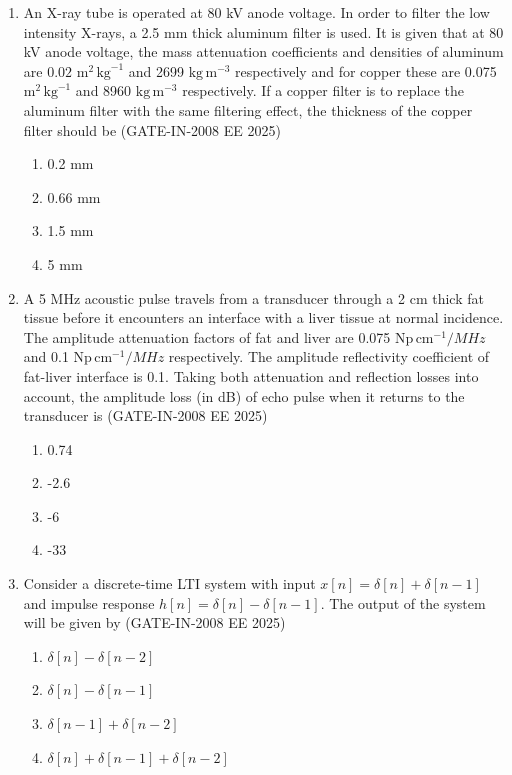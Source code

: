\documentclass[journal,12pt,onecolumn]{IEEEtran}
\theoremstyle{remark}
\begin{document}
\begin{enumerate}[label=Q.\arabic*,start=1]
    \item An X-ray tube is operated at 80 kV anode voltage. In order to filter the low intensity X-rays, a
2.5 mm thick aluminum filter is used. It is given that at 80 kV anode voltage, the mass attenuation
coefficients and densities of aluminum are $0.02$ $\text{m}^{2}\,\text{kg}^{-1}$ and 2699 $\text{kg}\,\text{m}^{-3}$ respectively and for copper
these are 0.075 $\text{m}^{2}\,\text{kg}^{-1}$ and 8960 $\text{kg}\,\text{m}^{-3}$ respectively. If a copper filter is to replace the aluminum
filter with the same filtering effect, the thickness of the copper filter should be (GATE-IN-2008 EE 2025)

    \begin{enumerate} 
        \item 0.2 mm
        \item 0.66 mm
        \item 1.5 mm
        \item 5 mm
    \end{enumerate}
    
    
    
    \item A 5 MHz acoustic pulse travels from a transducer through a 2 cm thick fat tissue before it
encounters an interface with a liver tissue at normal incidence. The amplitude attenuation factors of
fat and liver are 0.075 $\text{Np}\,\text{cm}^{-1}/MHz$ and 0.1 $\text{Np}\,\text{cm}^{-1}/MHz$ respectively. The amplitude reflectivity
coefficient of fat-liver interface is 0.1. Taking both attenuation and reflection losses into account,
the amplitude loss (in dB) of echo pulse when it returns to the transducer is
 (GATE-IN-2008 EE 2025)
  \begin{enumerate} 
        \item 0.74
        \item -2.6
        \item -6
        \item -33
\end{enumerate}

\item  Consider a discrete-time LTI system with input $x[n] = \delta[n] +\delta[n-1] $ and impulse response $h[n] =\delta[n]-\delta[n-1]$. The output of the system will be given by (GATE-IN-2008 EE 2025)
  \begin{enumerate} 
        \item $\delta[n]-\delta[n-2]$
        \item $\delta[n]-\delta[n-1]$
        \item $\delta[n-1]+\delta[n-2]$
        \item $\delta[n]+\delta[n-1]+\delta[n-2]$
  \end{enumerate}
  

\end{enumerate}
\end{document}

